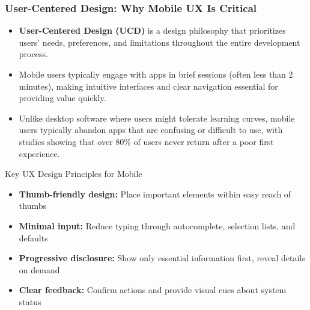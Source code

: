 \documentclass{beamer}
\begin{document}
	\begin{frame}
		\frametitle{User-Centered Design: Why Mobile UX Is Critical}
		
		\begin{itemize}
			\item \textbf{User-Centered Design (UCD)} is a design philosophy that prioritizes users' needs, preferences, and limitations throughout the entire development process.
			\item Mobile users typically engage with apps in brief sessions (often less than 2 minutes), making intuitive interfaces and clear navigation essential for providing value quickly.
			\item Unlike desktop software where users might tolerate learning curves, mobile users typically abandon apps that are confusing or difficult to use, with studies showing that over 80\% of users never return after a poor first experience.
		\end{itemize}
		
		\begin{exampleblock}{\scriptsize{Key UX Design Principles for Mobile}}
			\scriptsize{
				\begin{itemize}
					\item \textbf{Thumb-friendly design:} Place important elements within easy reach of thumbs
					\item \textbf{Minimal input:} Reduce typing through autocomplete, selection lists, and defaults
					\item \textbf{Progressive disclosure:} Show only essential information first, reveal details on demand
					\item \textbf{Clear feedback:} Confirm actions and provide visual cues about system status
				\end{itemize}
			}
		\end{exampleblock}
		
	\end{frame}
	
\end{document}
